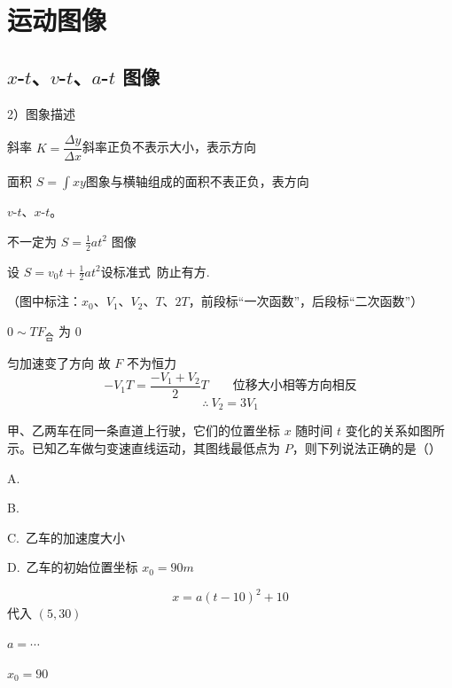 \section{运动图像}
\subsection{$x$-$t$、$v$-$t$、$a$-$t$ 图像}
2）图象描述

斜率 $K=\dfrac{\Delta y}{\Delta x}$\quad 斜率正负不表示大小，表示方向

面积 $S=\int xy$\quad 图象与横轴组成的面积\quad 不表正负，表方向 %

$v$-$t$、$x$-$t$。

不一定为 $S=\tfrac12at^2$ 图像

设 $S=v_0t+\tfrac12at^2$\quad 设标准式\ 防止有方. %

（图中标注：$x_0$、$V_1$、$V_2$、$T$、$2T$，前段标“一次函数”，后段标“二次函数”）

$0\sim T$\quad $F_{\text{合}}$ 为 $0$

匀加速\quad {}变了方向 故 $F$ 不为恒力
\[ -V_1T=\dfrac{-V_1+V_2}{2}T\qquad\text{位移大小相等方向相反} \]
\[ \therefore\ V_2=3V_1 \]

\begin{problem}
甲、乙两车在同一条直道上行驶，它们的位置坐标 $x$ 随时间 $t$ 变化的关系如图所示。已知乙车做匀变速直线运动，其图线最低点为 $P$，则下列说法正确的是（\quad）
\par A.\ 
\par B.\ 
\par C.\ 乙车的加速度大小
\par D.\ 乙车的初始位置坐标 $x_0=90\unit{m}$
\begin{solution}
\[ x=a(t-10)^2+10 \]
代入 $(5,30)$\par
$a=\cdots$\par
$x_0=90$
\end{solution}
\end{problem}

